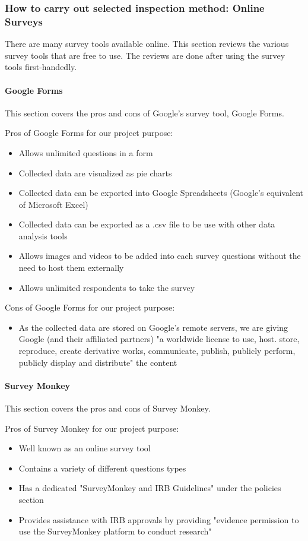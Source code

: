 \newpage

\subsubsection{How to carry out selected inspection method: Online Surveys}
There are many survey tools available online.
This section reviews the various survey tools that are free to use.
The reviews are done after using the survey tools first-handedly.

\paragraph{Google Forms}
This section covers the pros and cons of Google's survey tool, Google Forms.

Pros of Google Forms for our project purpose:
\begin{itemize}
\item Allows unlimited questions in a form
\item Collected data are visualized as pie charts
\item Collected data can be exported into Google Spreadsheets (Google's equivalent of Microsoft Excel)
\item Collected data can be exported as a .csv file to be use with other data analysis tools
\item Allows images and videos to be added into each survey questions without the need to host them externally
\item Allows unlimited respondents to take the survey
\end{itemize}

Cons of Google Forms for our project purpose:
\begin{itemize}
\item As the collected data are stored on Google's remote servers, we are giving Google (and their affiliated partners) "a worldwide license to use, host. store, reproduce, create derivative works, communicate, publish, publicly perform, publicly display and distribute" the content \cite{google}
\end{itemize}

\paragraph{Survey Monkey}
This section covers the pros and cons of Survey Monkey.

Pros of Survey Monkey for our project purpose:
\begin{itemize}
\item Well known as an online survey tool
\item Contains a variety of different questions types
\item Has a dedicated "SurveyMonkey and IRB Guidelines" under the policies section
\item Provides assistance with IRB approvals by providing "evidence permission to use the SurveyMonkey platform to conduct research" \cite{surveymonkey}
\end{itemize}

